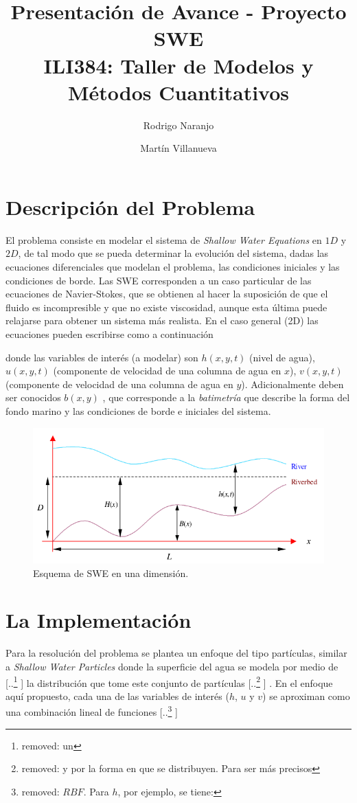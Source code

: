 \documentclass[spanish]{article} %
\title{Presentación de Avance - Proyecto SWE \\ILI384: Taller de Modelos y Métodos Cuantitativos}
\author{Rodrigo Naranjo \and Martín Villanueva}
\date{\DIFdelbegin \DIFdel{11 de noviembre 2015}\DIFdelend \DIFaddbegin \DIFadd{5 de Enero 2016}\DIFaddend }
\providecommand{\DIFaddtex}[1]{{\protect\color{blue} \sf #1}} %
\providecommand{\DIFdeltex}[1]{{\protect\color{red} [..\footnote{removed: #1} ]}} %
\providecommand{\DIFaddbegin}{} %
\providecommand{\DIFaddend}{} %
\providecommand{\DIFdelbegin}{} %
\providecommand{\DIFdelend}{} %
\providecommand{\DIFadd}[1]{\texorpdfstring{\DIFaddtex{#1}}{#1}} %
\providecommand{\DIFdel}[1]{\texorpdfstring{\DIFdeltex{#1}}{}} %
\begin{document}
\maketitle

\thispagestyle{empty}


\section{Descripción del Problema}
El problema consiste en modelar el sistema de \textit{Shallow Water Equations} en $1D$ y $2D$, de tal modo
que se pueda determinar la evolución del sistema, dadas las ecuaciones diferenciales que modelan el problema,
las condiciones iniciales y las condiciones de borde. Las SWE corresponden a un caso particular de las ecuaciones
de Navier-Stokes, que se obtienen al hacer la suposición de que el fluido es incompresible y que no existe viscosidad, aunque esta última puede relajarse para obtener un sistema más realista. En el caso general (2D) las ecuaciones pueden
escribirse como a continuación

\DIFaddend donde las variables de interés (a modelar) son $h(x,y,t)$ (nivel de agua), $u(x,y,t)$ (componente de velocidad de una columna de
agua en $x$), $v(x,y,t)$ (componente de velocidad de una columna de agua en $y$). Adicionalmente deben ser conocidos $b(x,y)$\DIFaddbegin \DIFadd{, }\DIFaddend que corresponde a la \textit{batimetría} que describe la forma del fondo marino  y las condiciones de borde e iniciales del sistema.

\begin{figure}[htpb!]
\centering
\includegraphics[scale=0.6]{schematic.png}
\caption{Esquema de SWE en una dimensión.}
\end{figure}

\section{La Implementación}
Para la resolución del problema se plantea un enfoque del tipo partículas, \DIFaddbegin \DIFadd{similar a \textit{Shallow Water Particles} \cite{swp} }\DIFaddend donde la superficie del agua se modela por medio de \DIFdelbegin \DIFdel{un }\DIFdelend \DIFaddbegin \DIFadd{la distribución que tome este }\DIFaddend conjunto de partículas\DIFdelbegin \DIFdel{y por la forma en que se distribuyen. Para ser más precisos}\DIFdelend \DIFaddbegin \DIFadd{. En el enfoque aquí propuesto}\DIFaddend , cada una de las variables de interés ($h$, $u$ y $v$) se aproximan como una combinación lineal de funciones \DIFdelbegin \DIFdel{$RBF$. Para $h$, por ejemplo, se tiene:
}%
\end{document}
